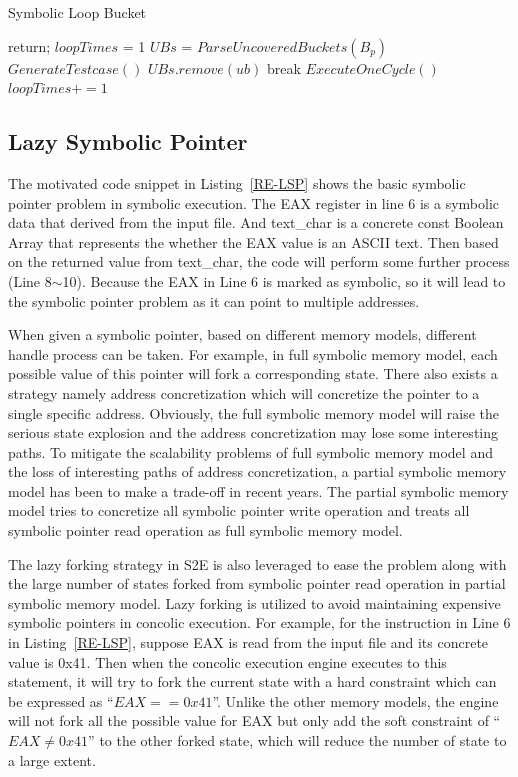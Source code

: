 \begin{algorithm}
  \caption{Symbolic Loop Bucket}
  \label{SLB}
  {
    return;
  }
  $loopTimes$ = 1\;
  $UBs$ = $ParseUncoveredBuckets(B_p)$\;
  {
    {
      {
        $GenerateTestcase()$\;
        $UBs$.$remove(ub)$\;
      }
    }
    {
      break\;
    }{
      $ExecuteOneCycle()$\;
      $loopTimes += 1$\;
    }
  }
\end{algorithm}  

\subsection{Lazy Symbolic Pointer}
The motivated code snippet in Listing~\ref{RE-LSP} shows the basic symbolic pointer problem in symbolic execution. The EAX register in line 6 is a symbolic data that derived from the input file. And text\_char is a concrete const Boolean Array that represents the whether the EAX value is an ASCII text. Then based on the returned value from text\_char, the code will perform some further process (Line 8$\sim$10). Because the EAX in Line 6 is marked as symbolic, so it will lead to the symbolic pointer problem as it can point to multiple addresses.


When given a symbolic pointer, based on different memory models, different handle process can be taken. For example, in full symbolic memory model, each possible value of this pointer will fork a corresponding state. There also exists a strategy namely address concretization which will concretize the pointer to a single specific address. Obviously, the full symbolic memory model will raise the serious state explosion and the address concretization may lose some interesting paths. To mitigate the scalability problems of full symbolic memory model and the loss of interesting paths of address concretization, a partial symbolic memory model has been to make a trade-off in recent years. The partial symbolic memory model tries to concretize all symbolic pointer write operation and treats all symbolic pointer read operation as full symbolic memory model. 

The lazy forking strategy in S2E is also leveraged to ease the problem along with the large number of states forked from symbolic pointer read operation in partial symbolic memory model. Lazy forking is utilized to avoid maintaining expensive symbolic pointers in concolic execution. For example, for the instruction in Line 6 in Listing~\ref{RE-LSP}, suppose EAX is read from the input file and its concrete value is 0x41. Then when the concolic execution engine executes to this statement, it will try to fork the current state with a hard constraint which can be expressed as ``$EAX == 0x41$''. Unlike the other memory models, the engine will not fork all the possible value for EAX but only add the soft constraint of ``$EAX \neq 0x41$'' to the other forked state, which will reduce the number of state to a large extent. 

